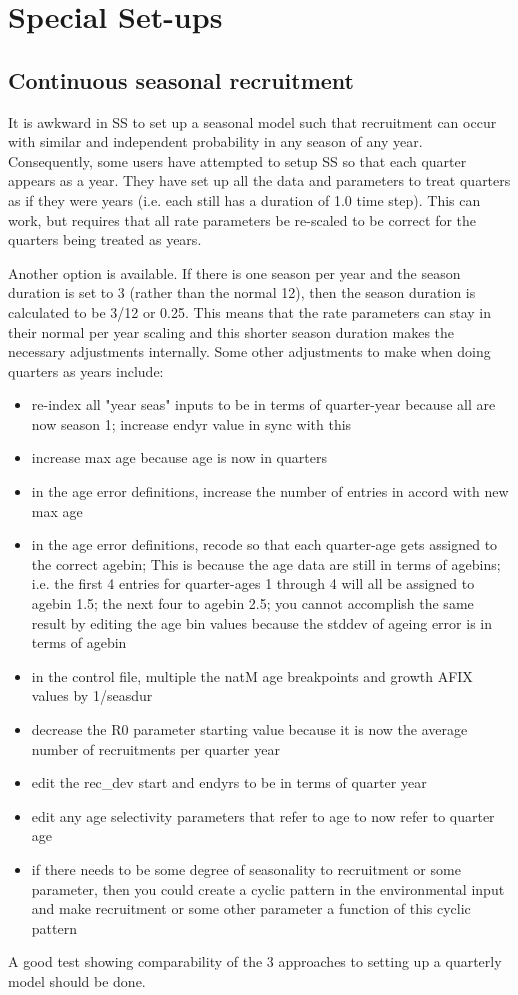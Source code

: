 \section{Special Set-ups}

\subsection{Continuous seasonal recruitment}
It is awkward in SS to set up a seasonal model such that recruitment can occur with similar and independent probability in any season of any year.  Consequently, some users have attempted to setup SS so that each quarter appears as a year.  They have set up all the data and parameters to treat quarters as if they were years (i.e. each still has a duration of 1.0 time step).  This can work, but requires that all rate parameters be re-scaled to be correct for the quarters being treated as years.

Another option is available.  If there is one season per year and the season duration is set to 3 (rather than the normal 12), then the season duration is calculated to be 3/12 or 0.25. This means that the rate parameters can stay in their normal per year scaling and this shorter season duration makes the necessary adjustments internally. Some other adjustments to make when doing quarters as years include:

\begin{itemize}
	\item re-index all "year seas" inputs to be in terms of quarter-year because all are now season 1; increase endyr value in sync with this
	\item increase max age because age is now in quarters
	\item in the age error definitions, increase the number of entries in accord with new max age
	\item in the age error definitions, recode so that each quarter-age gets assigned to the correct agebin;  This is because the age data are still in terms of agebins; i.e. the first 4 entries for quarter-ages 1 through 4 will all be assigned to agebin 1.5; the next four to agebin 2.5;  you cannot accomplish the same result by editing the age bin values because the stddev of ageing error is in terms of agebin
	\item in the control file, multiple the natM age breakpoints  and growth AFIX values by 1/seasdur
	\item decrease the R0 parameter starting value because it is now the average number of recruitments per quarter year
	\item edit the rec\_dev start and endyrs to be in terms of quarter year
	\item edit any age selectivity parameters that refer to age to now refer to quarter age
	\item if there needs to be some degree of seasonality to recruitment or some parameter, then you could create a cyclic pattern in the environmental input and make recruitment or some other parameter a function of this cyclic pattern
\end{itemize}
	
A good test showing comparability of the 3 approaches to setting up a quarterly model should be done.

